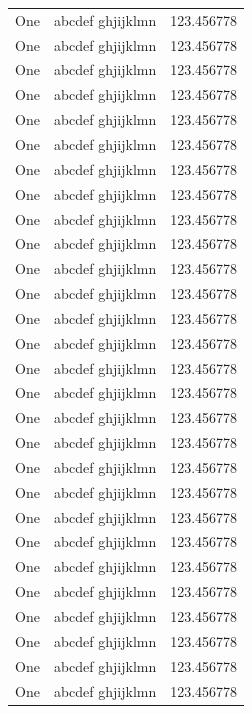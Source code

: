 \documentclass[zihao = -4, linespread = 1.5]{ctexart}
\begin{document}
\begin{center}
\begin{longtable}{|l|l|l|}
One & abcdef ghjijklmn & 123.456778 \\
One & abcdef ghjijklmn & 123.456778 \\
One & abcdef ghjijklmn & 123.456778 \\
One & abcdef ghjijklmn & 123.456778 \\
One & abcdef ghjijklmn & 123.456778 \\
One & abcdef ghjijklmn & 123.456778 \\
One & abcdef ghjijklmn & 123.456778 \\
One & abcdef ghjijklmn & 123.456778 \\
One & abcdef ghjijklmn & 123.456778 \\
One & abcdef ghjijklmn & 123.456778 \\
One & abcdef ghjijklmn & 123.456778 \\
One & abcdef ghjijklmn & 123.456778 \\
One & abcdef ghjijklmn & 123.456778 \\
One & abcdef ghjijklmn & 123.456778 \\
One & abcdef ghjijklmn & 123.456778 \\
One & abcdef ghjijklmn & 123.456778 \\
One & abcdef ghjijklmn & 123.456778 \\
One & abcdef ghjijklmn & 123.456778 \\
One & abcdef ghjijklmn & 123.456778 \\
One & abcdef ghjijklmn & 123.456778 \\
One & abcdef ghjijklmn & 123.456778 \\
One & abcdef ghjijklmn & 123.456778 \\
One & abcdef ghjijklmn & 123.456778 \\
One & abcdef ghjijklmn & 123.456778 \\
One & abcdef ghjijklmn & 123.456778 \\
One & abcdef ghjijklmn & 123.456778 \\
One & abcdef ghjijklmn & 123.456778 \\
One & abcdef ghjijklmn & 123.456778 \\
\end{longtable}
\end{center}
\end{document}
